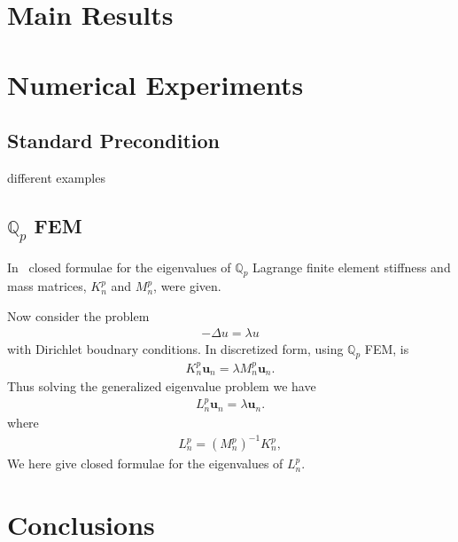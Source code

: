 \documentclass[10pt]{article}
\newcommand{\comm}[1]{{\color{red}{#1}}}
\begin{document}
\section{Main Results}
\section{Numerical Experiments}
\subsection{Standard Precondition}
 different examples
\subsection{$\mathbb{Q}_p$ FEM}
In~\cite{ekstrom181} closed formulae for the eigenvalues of $\mathbb{Q}_p$ Lagrange finite element stiffness and mass matrices, $K_n^{p}$ and $M_n^{p}$, were given. 


Now consider the problem
\begin{align}
-\Delta u=\lambda u
\end{align}
with Dirichlet boudnary conditions. In discretized form, using $\mathbb{Q}_p$ FEM, is
\begin{align}
K_n^{p}\mathbf{u}_n=\lambda M_n^{p}\mathbf{u}_n.
\end{align}
Thus solving the generalized eigenvalue problem we have
\begin{align}
L_n^{p}\mathbf{u}_n=\lambda \mathbf{u}_n.
\end{align}
where
\begin{align}
L_n^{p}=(M_n^{p})^{-1}K_n^{p},
\end{align}
We here give closed formulae for the eigenvalues of $L_n^{p}$.

\comm{insert correct scalings}

\comm{insert algorithm, see Code/Experiments/newblock.m}
\section{Conclusions}
{}

\end{document}
